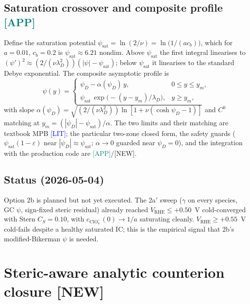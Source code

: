 \documentclass[11pt]{article}
\newcommand{\lit}{\textcolor{blue}{[LIT]}}
\newcommand{\app}{\textcolor{teal}{[APP]}}
\newcommand{\new}{\textcolor{red!70!black}{[NEW]}}
\newcommand{\eps}{\varepsilon}
\newcommand{\ClO}{\text{ClO}_4^-}
\begin{document}
\subsection{Saturation crossover and composite profile \app}
Define the saturation potential
\(\psi_{\mathrm{sat}} = \ln(2/\nu) = \ln\!\bigl(1/(a c_b)\bigr)\),
which for $a=0.01$, $c_b=0.2$ is $\psi_{\mathrm{sat}}\approx 6.21$ nondim.
Above $\psi_{\mathrm{sat}}$ the first integral linearises to
$(\psi')^2 \approx (2/(\nu\lambda_D^2))(|\psi|-\psi_{\mathrm{sat}})$;
below $\psi_{\mathrm{sat}}$ it linearises to the standard
Debye exponential.  The composite asymptotic profile is
\begin{equation}
  \psi(y) =
  \begin{cases}
    \psi_D - \alpha(\psi_D)\,y,
       & 0\le y\le y_m,\\[3pt]
    \psi_{\mathrm{sat}}\,\exp\!\bigl(-(y-y_m)/\lambda_D\bigr),
       & y\ge y_m,
  \end{cases}
  \label{eq:composite-psi}
\end{equation}
with slope
\(\alpha(\psi_D)=\sqrt{(2/(\nu\lambda_D^2))\ln[1+\nu(\cosh\psi_D-1)]}\)
and $C^0$ matching at $y_m=(|\psi_D|-\psi_{\mathrm{sat}})/\alpha$.
The two limits and their matching are textbook MPB \lit{}; the
particular two-zone closed form, the safety guards
($\psi_{\mathrm{sat}}(1-\eps)$ near $|\psi_D|\approx\psi_{\mathrm{sat}}$;
$\alpha\to 0$ guarded near $\psi_D=0$), and the integration with the
production code are \app{}/\new{}.

\subsection{Status (2026-05-04)}
Option 2b is planned but not yet executed.  The 2a$'$ sweep
($\gamma$ on every species, GC $\psi$, sign-fixed steric residual)
already reached $V_{\mathrm{RHE}}\le +0.50$~V cold-converged with
Stern $C_S=0.10$, with $c_{\ClO}(0)\to 1/a$ saturating cleanly.
$V_{\mathrm{RHE}}\ge +0.55$~V cold-fails despite a healthy
saturated IC; this is the empirical signal that 2b's
modified-Bikerman $\psi$ is needed.

\section{Steric-aware analytic counterion closure \new}
\label{sec:steric-boltzmann}
\end{document}

